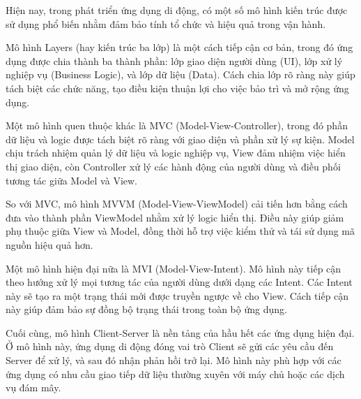         \hspace*{0.8cm}Hiện nay, trong phát triển ứng dụng di động, có một số mô hình kiến trúc được sử dụng phổ biến nhằm đảm bảo tính tổ chức và hiệu quả trong vận hành.
    
        \vspace{0.5em}
    
        \hspace*{0.8cm}Mô hình Layers (hay kiến trúc ba lớp) là một cách tiếp cận cơ bản, trong đó ứng dụng được chia thành ba thành phần: lớp giao diện người dùng (UI), lớp xử lý nghiệp vụ (Business Logic), và lớp dữ liệu (Data). Cách chia lớp rõ ràng này giúp tách biệt các chức năng, tạo điều kiện thuận lợi cho việc bảo trì và mở rộng ứng dụng.
      
        \vspace{0.5em}
      
        \hspace*{0.8cm}Một mô hình quen thuộc khác là MVC (Model-View-Controller), trong đó phần dữ liệu và logic được tách biệt rõ ràng với giao diện và phần xử lý sự kiện. Model chịu trách nhiệm quản lý dữ liệu và logic nghiệp vụ, View đảm nhiệm việc hiển thị giao diện, còn Controller xử lý các hành động của người dùng và điều phối tương tác giữa Model và View.
      
        \vspace{0.5em}
      
        \hspace*{0.8cm}So với MVC, mô hình MVVM (Model-View-ViewModel) cải tiến hơn bằng cách đưa vào thành phần ViewModel nhằm xử lý logic hiển thị. Điều này giúp giảm phụ thuộc giữa View và Model, đồng thời hỗ trợ việc kiểm thử và tái sử dụng mã nguồn hiệu quả hơn.
      
        \vspace{0.5em}
      
        \hspace*{0.8cm}Một mô hình hiện đại nữa là MVI (Model-View-Intent). Mô hình này tiếp cận theo hướng xử lý mọi tương tác của người dùng dưới dạng các Intent. Các Intent này sẽ tạo ra một trạng thái mới được truyền ngược về cho View. Cách tiếp cận này giúp đảm bảo sự đồng bộ trạng thái trong toàn bộ ứng dụng.
      
        \vspace{0.5em}
      
        \hspace*{0.8cm}Cuối cùng, mô hình Client-Server là nền tảng của hầu hết các ứng dụng hiện đại. Ở mô hình này, ứng dụng di động đóng vai trò Client sẽ gửi các yêu cầu đến Server để xử lý, và sau đó nhận phản hồi trở lại. Mô hình này phù hợp với các ứng dụng có nhu cầu giao tiếp dữ liệu thường xuyên với máy chủ hoặc các dịch vụ đám mây.
      


